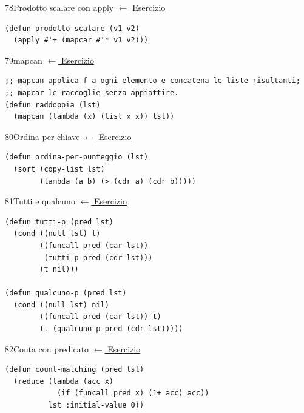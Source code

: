 \label{sol:78}
\begin{solbox}{78}{Prodotto scalare con apply}
\small\color{black!55}\hyperref[ex:78]{$\leftarrow$ Esercizio}\normalsize\color{black}
\begin{lstlisting}
(defun prodotto-scalare (v1 v2)
  (apply #'+ (mapcar #'* v1 v2)))
\end{lstlisting}
\end{solbox}

\label{sol:79}
\begin{solbox}{79}{mapcan}
\small\color{black!55}\hyperref[ex:79]{$\leftarrow$ Esercizio}\normalsize\color{black}
\begin{lstlisting}
;; mapcan applica f a ogni elemento e concatena le liste risultanti;
;; mapcar le raccoglie senza appiattire.
(defun raddoppia (lst)
  (mapcan (lambda (x) (list x x)) lst))
\end{lstlisting}
\end{solbox}

\label{sol:80}
\begin{solbox}{80}{Ordina per chiave}
\small\color{black!55}\hyperref[ex:80]{$\leftarrow$ Esercizio}\normalsize\color{black}
\begin{lstlisting}
(defun ordina-per-punteggio (lst)
  (sort (copy-list lst)
        (lambda (a b) (> (cdr a) (cdr b)))))
\end{lstlisting}
\end{solbox}

\label{sol:81}
\begin{solbox}{81}{Tutti e qualcuno}
\small\color{black!55}\hyperref[ex:81]{$\leftarrow$ Esercizio}\normalsize\color{black}
\begin{lstlisting}
(defun tutti-p (pred lst)
  (cond ((null lst) t)
        ((funcall pred (car lst))
         (tutti-p pred (cdr lst)))
        (t nil)))

(defun qualcuno-p (pred lst)
  (cond ((null lst) nil)
        ((funcall pred (car lst)) t)
        (t (qualcuno-p pred (cdr lst)))))
\end{lstlisting}
\end{solbox}

\label{sol:82}
\begin{solbox}{82}{Conta con predicato}
\small\color{black!55}\hyperref[ex:82]{$\leftarrow$ Esercizio}\normalsize\color{black}
\begin{lstlisting}
(defun count-matching (pred lst)
  (reduce (lambda (acc x)
            (if (funcall pred x) (1+ acc) acc))
          lst :initial-value 0))
\end{lstlisting}
\end{solbox}

